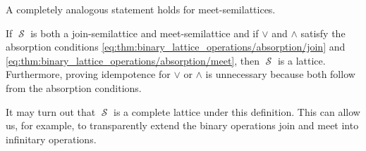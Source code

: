 \begin{proposition}
\begin{thmenum}
    A completely analogous statement holds for meet-semilattices.

    If \( \mscrS \) is both a join-semilattice and meet-semilattice and if \( \vee \) and \( \wedge \) satisfy the absorption conditions \eqref{eq:thm:binary_lattice_operations/absorption/join} and \eqref{eq:thm:binary_lattice_operations/absorption/meet}, then \( \mscrS \) is a lattice. Furthermore, proving idempotence for \( \vee \) or \( \wedge \) is unnecessary because both follow from the absorption conditions.

    It may turn out that \( \mscrS \) is a complete lattice under this definition. This can allow us, for example, to transparently extend the binary operations join and meet into infinitary operations.
  \end{thmenum}
\end{proposition}

